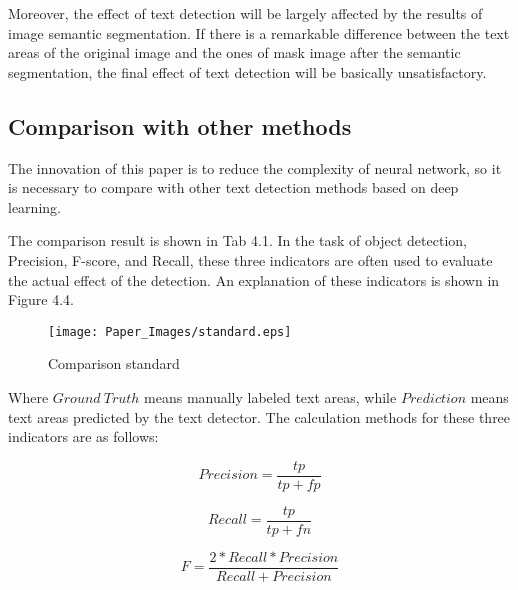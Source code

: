 \documentclass[22pt, UTF8]{article}
\numberwithin{figure}{section}
\numberwithin{table}{section}
\numberwithin{equation}{section} %
\begin{document}
\setlength\parindent{2em} Moreover, the effect of text detection will be largely affected by the results of image semantic segmentation. If there is a remarkable difference between the text areas of the original image and the ones of mask image after the semantic segmentation, the final effect of text detection will be basically unsatisfactory.

\subsection{Comparison with other methods}

\setlength\parindent{2em} The innovation of this paper is to reduce the complexity of neural network, so it is necessary to compare with other text detection methods based on deep learning.

\setlength\parindent{2em}The comparison result is shown in Tab 4.1. In the task of object detection, Precision, F-score, and Recall, these three indicators are often used to evaluate the actual effect of the detection. An explanation of these indicators is shown in Figure 4.4.

\begin{figure}[htbp]
    \begin{center}
        \texttt{[image: Paper\_Images/standard.eps]}
    \end{center}
    \vspace{-3mm} %
    \caption{Comparison standard}
    \vspace{-4mm} %
\end{figure}

\noindent Where $Ground\ Truth$ means manually labeled text areas, while $Prediction$ means text areas predicted by the text detector. The calculation methods for these three indicators are as follows:

\vspace{-2mm} %
\begin{equation} %
Precision = \frac{tp}{tp + fp}
\end{equation}

\vspace{-2mm} %
\begin{equation} %
Recall = \frac{tp}{tp + fn}
\end{equation}

\vspace{-2mm} %
\begin{equation} %
F = \frac{2 * Recall * Precision}{Recall + Precision}
\end{equation}
\end{document}
